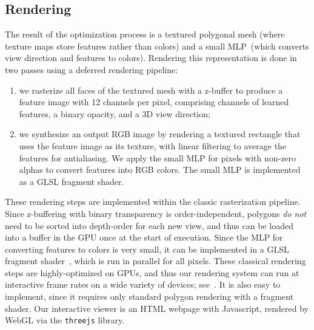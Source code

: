 \subsection{Rendering}
\label{sec:rendering}
The result of the optimization process is a textured polygonal mesh (where texture maps store features rather than colors) and a small MLP~(which converts view direction and features to colors).
Rendering this representation is done in two passes using a deferred rendering pipeline:
\begin{enumerate}
\item we rasterize all faces of the textured mesh with a z-buffer to produce a  feature image with 12 channels per pixel, comprising  channels of learned features, a binary opacity, and a 3D view direction;
\item we synthesize an  output RGB image by rendering a textured rectangle that uses the feature image as its texture, with linear filtering to average the features for antialiasing. We apply the small MLP for pixels with non-zero alphas to convert features into RGB colors. The small MLP is implemented as a GLSL fragment shader.
\end{enumerate}
These rendering steps are implemented within the classic rasterization pipeline.  Since z-buffering with binary transparency is order-independent, polygons \textit{do not} need to be sorted into depth-order for each new view, and thus can be loaded into a buffer in the GPU once at the start of execution.
Since the MLP for converting features to colors is very small, it can be implemented in a GLSL fragment shader~\cite{hedman2021snerg}, which is run in parallel for all pixels.
These classical rendering steps are highly-optimized on GPUs, and thus our rendering system can run at interactive frame rates on a wide variety of devices; see~.
It is also easy to implement, since it requires only standard polygon rendering with a fragment shader.
Our interactive viewer is an HTML webpage with Javascript, rendered by WebGL via the \texttt{threejs} library.


